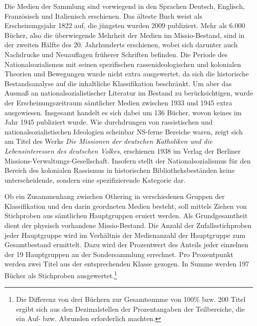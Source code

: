 \documentclass[a4paper,
fontsize=11pt,
oneside,
numbers=noperiodatend,
parskip=half-,
bibliography=totoc,
final
]{scrartcl}
\begin{document}
Die Medien der Sammlung sind vorwiegend in den Sprachen Deutsch,
Englisch, Französisch und Italienisch erschienen. Das älteste Buch weist
als Erscheinungsjahr 1822 auf, die jüngsten wurden 2009 publiziert. Mehr
als 6.000 Bücher, also die überwiegende Mehrheit der Medien im
Missio-Bestand, sind in der zweiten Hälfte des 20. Jahrhunderts
erschienen, wobei sich darunter auch Nachdrucke und Neuauflagen früherer
Schriften befinden. Die Periode des Nationalsozialismus mit seinen
spezifischen rassenideologischen und kolonialen Theorien und Bewegungen
wurde nicht extra ausgewertet, da sich die historische Bestandsanalyse
auf die inhaltliche Klassifikation beschränkt. Um aber das Ausmaß an
nationalsozialistischer Literatur im Bestand zu berücksichtigen, wurde
der Erscheinungszeitraum sämtlicher Medien zwischen 1933 und 1945 extra
ausgewiesen. Insgesamt handelt es sich dabei um 136 Bücher, wovon keines
im Jahr 1945 publiziert wurde. Wie durchdrungen von rassistischen und
nationalsozialistischen Ideologien scheinbar NS-ferne Bereiche waren,
zeigt sich am Titel des Werks \emph{Die Missionen der deutschen
Katholiken und die Lebensinteressen des deutschen Volkes}, erschienen
1938 im Verlag der Berliner Missions-Verwaltungs-Gesellschaft. Insofern
stellt der Nationalsozialismus für den Bereich des kolonialen Rassismus
in historischen Bibliotheksbeständen keine unterscheidende, sondern eine
spezifizierende Kategorie dar.

Ob ein Zusammenhang zwischen Othering in verschiedenen Gruppen der
Klassifikation und den darin geordneten Medien besteht, soll mittels
Ziehen von Stichproben aus sämtlichen \linebreak\mbox{Hauptgruppen} eruiert werden. Als
Grundgesamtheit dient der physisch vorhandene Missio-Bestand. Die Anzahl
der Zufallsstichproben jeder Hauptgruppe wird im Verhältnis der
Medienanzahl der Hauptgruppe zum Gesamtbestand ermittelt. Dazu wird der
Prozentwert des Anteils jeder einzelnen der 19 Hauptgruppen an der
Sondersammlung errechnet. Pro Prozentpunkt werden zwei Titel aus der
entsprechenden Klasse gezogen. In Summe werden 197 Bücher als
Stichproben ausgewertet.\footnote{Die Differenz von drei Büchern zur
  Gesamtsumme von 100\% bzw. 200 Titel ergibt sich aus den
  Dezimalstellen der Prozentangaben der Teilbereiche, die ein Auf- bzw.
  Abrunden erforderlich machten.}
\end{document}
